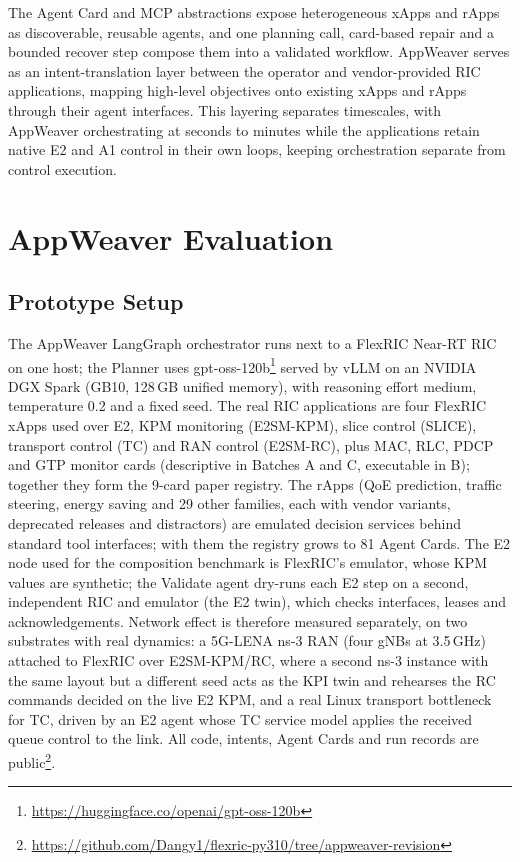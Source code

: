\documentclass[conference]{IEEEtran}
\begin{document}
The Agent Card and MCP abstractions expose heterogeneous xApps and rApps as discoverable, reusable agents, and one planning call, card-based repair and a bounded recover step compose them into a validated workflow. AppWeaver serves as an intent-translation layer between the operator and vendor-provided RIC applications, mapping high-level objectives onto existing xApps and rApps through their agent interfaces. This layering separates timescales, with AppWeaver orchestrating at seconds to minutes while the applications retain native E2 and A1 control in their own loops, keeping orchestration separate from control execution.


\section{AppWeaver Evaluation}\label{sec:evaluation}
\subsection{Prototype Setup}
The AppWeaver LangGraph orchestrator runs next to a FlexRIC Near-RT RIC on one host; the Planner uses gpt-oss-120b\footnote{\url{https://huggingface.co/openai/gpt-oss-120b}} served by vLLM on an NVIDIA DGX Spark (GB10, 128\,GB unified memory), with reasoning effort medium, temperature 0.2 and a fixed seed. The real RIC applications are four FlexRIC xApps used over E2, KPM monitoring (E2SM-KPM), slice control (SLICE), transport control (TC) and RAN control (E2SM-RC), plus MAC, RLC, PDCP and GTP monitor cards (descriptive in Batches A and C, executable in B); together they form the 9-card paper registry. The rApps (QoE prediction, traffic steering, energy saving and 29 other families, each with vendor variants, deprecated releases and distractors) are emulated decision services behind standard tool interfaces; with them the registry grows to 81 Agent Cards. The E2 node used for the composition benchmark is FlexRIC's emulator, whose KPM values are synthetic; the Validate agent dry-runs each E2 step on a second, independent RIC and emulator (the E2 twin), which checks interfaces, leases and acknowledgements. Network effect is therefore measured separately, on two substrates with real dynamics: a 5G-LENA ns-3 RAN (four gNBs at 3.5\,GHz) attached to FlexRIC over E2SM-KPM/RC, where a second ns-3 instance with the same layout but a different seed acts as the KPI twin and rehearses the RC commands decided on the live E2 KPM, and a real Linux transport bottleneck for TC, driven by an E2 agent whose TC service model applies the received queue control to the link. All code, intents, Agent Cards and run records are public\footnote{\url{https://github.com/Dangy1/flexric-py310/tree/appweaver-revision}}.
\end{document}
